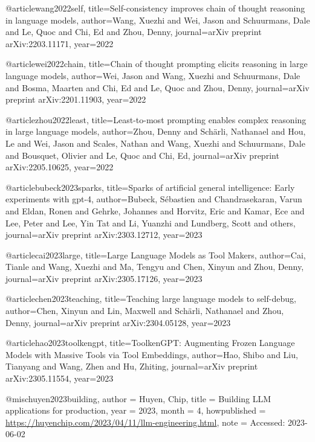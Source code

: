 @article{wang2022self,
  title={Self-consistency improves chain of thought reasoning in language models},
  author={Wang, Xuezhi and Wei, Jason and Schuurmans, Dale and Le, Quoc and Chi, Ed and Zhou, Denny},
  journal={arXiv preprint arXiv:2203.11171},
  year={2022}
}

@article{wei2022chain,
  title={Chain of thought prompting elicits reasoning in large language models},
  author={Wei, Jason and Wang, Xuezhi and Schuurmans, Dale and Bosma, Maarten and Chi, Ed and Le, Quoc and Zhou, Denny},
  journal={arXiv preprint arXiv:2201.11903},
  year={2022}
}

@article{zhou2022least,
  title={Least-to-most prompting enables complex reasoning in large language models},
  author={Zhou, Denny and Sch{\"a}rli, Nathanael and Hou, Le and Wei, Jason and Scales, Nathan and Wang, Xuezhi and Schuurmans, Dale and Bousquet, Olivier and Le, Quoc and Chi, Ed},
  journal={arXiv preprint arXiv:2205.10625},
  year={2022}
}


@article{bubeck2023sparks,
  title={Sparks of artificial general intelligence: Early experiments with gpt-4},
  author={Bubeck, S{\'e}bastien and Chandrasekaran, Varun and Eldan, Ronen and Gehrke, Johannes and Horvitz, Eric and Kamar, Ece and Lee, Peter and Lee, Yin Tat and Li, Yuanzhi and Lundberg, Scott and others},
  journal={arXiv preprint arXiv:2303.12712},
  year={2023}
}

@article{cai2023large,
  title={Large Language Models as Tool Makers},
  author={Cai, Tianle and Wang, Xuezhi and Ma, Tengyu and Chen, Xinyun and Zhou, Denny},
  journal={arXiv preprint arXiv:2305.17126},
  year={2023}
}

@article{chen2023teaching,
  title={Teaching large language models to self-debug},
  author={Chen, Xinyun and Lin, Maxwell and Sch{\"a}rli, Nathanael and Zhou, Denny},
  journal={arXiv preprint arXiv:2304.05128},
  year={2023}
}

@article{hao2023toolkengpt,
  title={ToolkenGPT: Augmenting Frozen Language Models with Massive Tools via Tool Embeddings},
  author={Hao, Shibo and Liu, Tianyang and Wang, Zhen and Hu, Zhiting},
  journal={arXiv preprint arXiv:2305.11554},
  year={2023}
}

@misc{huyen2023building,
  author = {Huyen, Chip},
  title = {Building LLM applications for production},
  year = {2023},
  month = {4},
  howpublished = {\url{https://huyenchip.com/2023/04/11/llm-engineering.html}},
  note = {Accessed: 2023-06-02}
}

